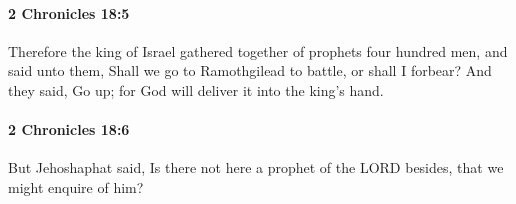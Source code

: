 		\paragraph{2 Chronicles 18:5} %
			\label{2CHRONICLES-18-5}

			Therefore the king of Israel gathered together of prophets four hundred men, and said unto them, Shall we go to Ramothgilead to battle, or shall I forbear? And they said, Go up; for God will deliver it into the king's hand.


		\paragraph{2 Chronicles 18:6} %
			\label{2CHRONICLES-18-6}

			But Jehoshaphat said, Is there not here a prophet of the LORD besides, that we might enquire of him?


